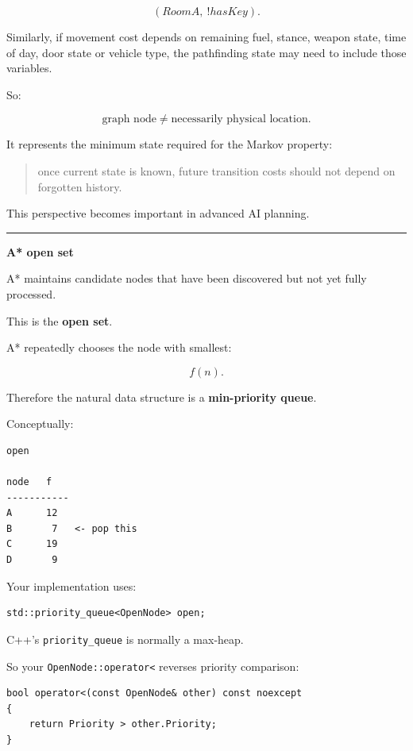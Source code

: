 \[
(RoomA,\ !hasKey).
\]

Similarly, if movement cost depends on remaining fuel, stance, weapon state, time of day, door state or vehicle type, the pathfinding state may need to include those variables.

So:

\[
\boxed{
\text{graph node}
\neq
\text{necessarily physical location}.
}
\]

It represents the minimum state required for the Markov property:

\begin{quote}
once current state is known, future transition costs should not depend on forgotten history.
\end{quote}

This perspective becomes important in advanced AI planning.

\begin{center}\rule{0.5\linewidth}{0.5pt}\end{center}

\textbf{A* open set}

A* maintains candidate nodes that have been discovered but not yet fully processed.

This is the \textbf{open set}.

A* repeatedly chooses the node with smallest:

\[
f(n).
\]

Therefore the natural data structure is a \textbf{min-priority queue}.

Conceptually:

\begin{verbatim}
open

node   f
-----------
A      12
B       7   <- pop this
C      19
D       9
\end{verbatim}

Your implementation uses:

\begin{verbatim}
std::priority_queue<OpenNode> open;
\end{verbatim}

C++'s \texttt{priority\_queue} is normally a max-heap.

So your \texttt{OpenNode::operator\textless{}} reverses priority comparison:

\begin{verbatim}
bool operator<(const OpenNode& other) const noexcept
{
    return Priority > other.Priority;
}
\end{verbatim}

